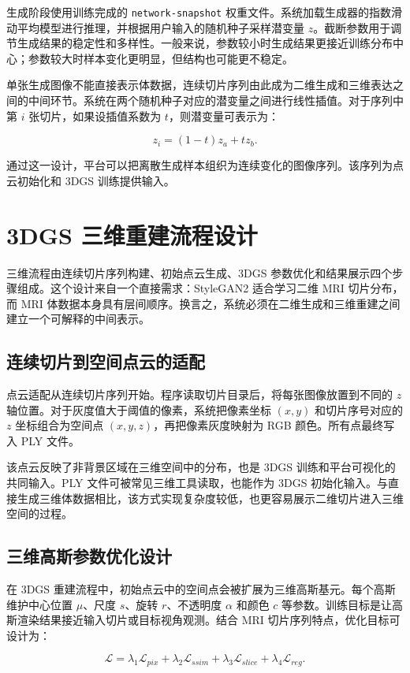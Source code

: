 生成阶段使用训练完成的 \texttt{network-snapshot} 权重文件。系统加载生成器的指数滑动平均模型进行推理，并根据用户输入的随机种子采样潜变量 $z$。截断参数用于调节生成结果的稳定性和多样性。一般来说，参数较小时生成结果更接近训练分布中心；参数较大时样本变化更明显，但结构也可能更不稳定。

单张生成图像不能直接表示体数据，连续切片序列由此成为二维生成和三维表达之间的中间环节。系统在两个随机种子对应的潜变量之间进行线性插值。对于序列中第 $i$ 张切片，如果设插值系数为 $t$，则潜变量可表示为：

\begin{equation}
z_i = (1-t)z_a + tz_b .
\end{equation}

通过这一设计，平台可以把离散生成样本组织为连续变化的图像序列。该序列为点云初始化和 3DGS 训练提供输入。

\section{3DGS 三维重建流程设计}
三维流程由连续切片序列构建、初始点云生成、3DGS 参数优化和结果展示四个步骤组成。这个设计来自一个直接需求：StyleGAN2 适合学习二维 MRI 切片分布，而 MRI 体数据本身具有层间顺序。换言之，系统必须在二维生成和三维重建之间建立一个可解释的中间表示。

\subsection{连续切片到空间点云的适配}
点云适配从连续切片序列开始。程序读取切片目录后，将每张图像放置到不同的 $z$ 轴位置。对于灰度值大于阈值的像素，系统把像素坐标 $(x,y)$ 和切片序号对应的 $z$ 坐标组合为空间点 $(x,y,z)$，再把像素灰度映射为 RGB 颜色。所有点最终写入 PLY 文件。

该点云反映了非背景区域在三维空间中的分布，也是 3DGS 训练和平台可视化的共同输入。PLY 文件可被常见三维工具读取，也能作为 3DGS 初始化输入。与直接生成三维体数据相比，该方式实现复杂度较低，也更容易展示二维切片进入三维空间的过程。

\subsection{三维高斯参数优化设计}
在 3DGS 重建流程中，初始点云中的空间点会被扩展为三维高斯基元。每个高斯维护中心位置 $\mu$、尺度 $s$、旋转 $r$、不透明度 $\alpha$ 和颜色 $c$ 等参数。训练目标是让高斯渲染结果接近输入切片或目标视角观测。结合 MRI 切片序列特点，优化目标可设计为：

\begin{equation}
\mathcal{L} = \lambda_1 \mathcal{L}_{pix} + \lambda_2 \mathcal{L}_{ssim} + \lambda_3 \mathcal{L}_{slice} + \lambda_4 \mathcal{L}_{reg}.
\end{equation}

